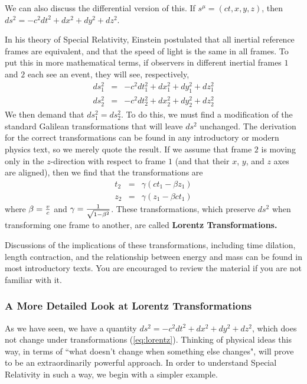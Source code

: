\documentclass[12pt,epsf]{article}
\def\nolabel{\nonumber }
\def\nolabel{\nonumber }
\begin{document}
We can also discuss the differential version of this.  If $s^{\mu} =
(ct,x,y,z)$, then $ds^2 = -c^2dt^2+dx^2+dy^2+dz^2$.

In his theory of Special Relativity, Einstein postulated that all
inertial reference frames are equivalent, and that the speed of light
is the same in all frames.  To put this in more mathematical terms, if
observers in different inertial frames $1$ and $2$ each see an event,
they will see, respectively,
\begin{eqnarray}
ds_1^2 &=& -c^2dt_1^2+dx^2_1+dy^2_1+dz_1^2 \nolabel \\
ds_2^2 &=& -c^2 dt_2^2+dx^2_2+dy^2_2+dz^2_2 \nolabel
\end{eqnarray}
We then demand that $ds_1^2 = ds^2_2$.	To do this, we must find a
modification of the standard Galilean transformations that will leave
$ds^2$ unchanged.  The derivation for the correct transformations can
be found in any introductory or modern physics text, so we merely quote
the result.  If we assume that frame $2$ is moving only in the $z$-direction
with respect to frame $1$ (and that their $x$, $y$, and $z$ axes are aligned),
then we find that the transformations are 
\begin{eqnarray}
t_2 &=& \gamma(ct_1-\beta z_1) \nolabel \\
z_2 &=& \gamma(z_1 - \beta ct_1) \label{eq:lorentz}
\end{eqnarray}
where $\beta = {v\over c}$ and $\gamma = {1\over \sqrt{1-\beta^2}}$. 
These transformations, which preserve $ds^2$ when transforming one
frame to another, are called \bf Lorentz Transformations\rm.  

Discussions of the implications of these transformations, including
time dilation, length contraction, and the relationship between energy
and mass can be found in most introductory texts.  You are encouraged
to review the material if you are not familiar with it.  

\subsubsection{A More Detailed Look at Lorentz Transformations}
\label{sec:lorentzdetail}

As we have seen, we have a quantity $ds^2 = -c^2dt^2+dx^2+dy^2+dz^2$,
which does not change under transformations (\ref{eq:lorentz}). 
Thinking of physical ideas this way, in terms of ``what doesn't change
when something else changes", will prove to be an extraordinarily
powerful approach.  In order to understand Special Relativity in such a
way, we begin with a simpler example.  
\end{document}

